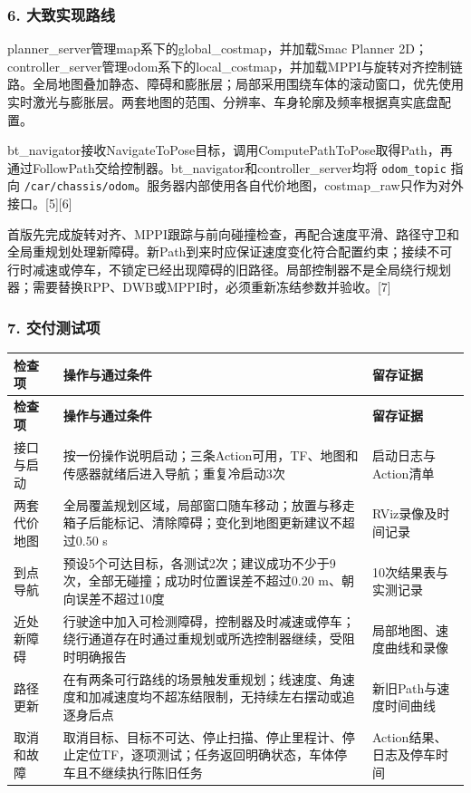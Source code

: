 \documentclass[UTF8,fontset=fandol,11pt,a4paper]{ctexart}
\begin{document}
\subsubsection*{6. 大致实现路线}
planner\_server管理map系下的global\_costmap，并加载Smac Planner 2D；controller\_server管理odom系下的local\_costmap，并加载MPPI与旋转对齐控制链路。全局地图叠加静态、障碍和膨胀层；局部采用围绕车体的滚动窗口，优先使用实时激光与膨胀层。两套地图的范围、分辨率、车身轮廓及频率根据真实底盘配置。

bt\_navigator接收NavigateToPose目标，调用ComputePathToPose取得Path，再通过FollowPath交给控制器。bt\_navigator和controller\_server均将 \nolinkurl{odom_topic} 指向 \nolinkurl{/car/chassis/odom}。服务器内部使用各自代价地图，costmap\_raw只作为对外接口。[5][6]

首版先完成旋转对齐、MPPI跟踪与前向碰撞检查，再配合速度平滑、路径守卫和全局重规划处理新障碍。新Path到来时应保证速度变化符合配置约束；接续不可行时减速或停车，不锁定已经出现障碍的旧路径。局部控制器不是全局绕行规划器；需要替换RPP、DWB或MPPI时，必须重新冻结参数并验收。[7]

\subsubsection*{7. 交付测试项}
{\small
\begin{longtable}{|>{\raggedright\arraybackslash}p{}|>{\raggedright\arraybackslash}p{}|>{\raggedright\arraybackslash}p{}|}
\hline
\rowcolor{TableHead} \textbf{检查项} & \textbf{操作与通过条件} & \textbf{留存证据} \\ \hline
\endfirsthead
\hline
\rowcolor{TableHead} \textbf{检查项} & \textbf{操作与通过条件} & \textbf{留存证据} \\ \hline
\endhead
\endfoot
\endlastfoot
接口与启动 & 按一份操作说明启动；三条Action可用，TF、地图和传感器就绪后进入导航；重复冷启动3次 & 启动日志与Action清单 \\ \hline
两套代价地图 & 全局覆盖规划区域，局部窗口随车移动；放置与移走箱子后能标记、清除障碍；变化到地图更新建议不超过0.50 s & RViz录像及时间记录 \\ \hline
到点导航 & 预设5个可达目标，各测试2次；建议成功不少于9次，全部无碰撞；成功时位置误差不超过0.20 m、朝向误差不超过10度 & 10次结果表与实测记录 \\ \hline
近处新障碍 & 行驶途中加入可检测障碍，控制器及时减速或停车；绕行通道存在时通过重规划或所选控制器继续，受阻时明确报告 & 局部地图、速度曲线和录像 \\ \hline
路径更新 & 在有两条可行路线的场景触发重规划；线速度、角速度和加减速度均不超冻结限制，无持续左右摆动或追逐身后点 & 新旧Path与速度时间曲线 \\ \hline
取消和故障 & 取消目标、目标不可达、停止扫描、停止里程计、停止定位TF，逐项测试；任务返回明确状态，车体停车且不继续执行陈旧任务 & Action结果、日志及停车时间 \\ \hline
\end{longtable}
}
\end{document}
